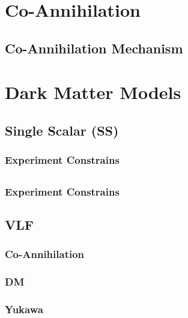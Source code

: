 \documentclass[compress,xcolor=table]{beamer}
\begin{document}
\section{Co-Annihilation}
\subsection{Co-Annihilation Mechanism} 

\begin{frame}{}

\end{frame}

\section{Dark Matter Models} 
\subsection{Single Scalar (SS)}
\subsubsection{Experiment Constrains}
\begin{frame}{}

\end{frame}


\subsection{}
\subsubsection{Experiment Constrains}

\subsection{VLF}
\subsubsection{Co-Annihilation}
\subsubsection{DM}
\subsubsection{Yukawa}
\end{document}
